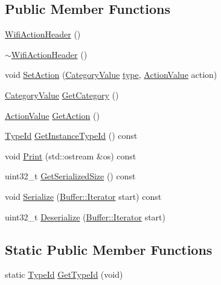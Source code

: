 \subsection*{Public Member Functions}
\begin{DoxyCompactItemize}
\item 
\hyperlink{classns3_1_1WifiActionHeader_a816b15ecdd8e7694c87a858764b214c3}{Wifi\+Action\+Header} ()
\item 
\hyperlink{classns3_1_1WifiActionHeader_a434e2b6cda0d7083112f56834cc57152}{$\sim$\+Wifi\+Action\+Header} ()
\item 
void \hyperlink{classns3_1_1WifiActionHeader_ab904b1e476e1dd0e0426c84c5970a2eb}{Set\+Action} (\hyperlink{classns3_1_1WifiActionHeader_a5402becd11b4077f22d76c4d0d923358}{Category\+Value} \hyperlink{visualizer-ideas_8txt_add98db9e15e2a58cf2b57623e7aa893a}{type}, \hyperlink{unionns3_1_1WifiActionHeader_1_1ActionValue}{Action\+Value} action)
\item 
\hyperlink{classns3_1_1WifiActionHeader_a5402becd11b4077f22d76c4d0d923358}{Category\+Value} \hyperlink{classns3_1_1WifiActionHeader_a6770270aecf8921377529d1c16cc10f2}{Get\+Category} ()
\item 
\hyperlink{unionns3_1_1WifiActionHeader_1_1ActionValue}{Action\+Value} \hyperlink{classns3_1_1WifiActionHeader_a9ec1872abca36121927fb83c837a4966}{Get\+Action} ()
\item 
\hyperlink{classns3_1_1TypeId}{Type\+Id} \hyperlink{classns3_1_1WifiActionHeader_a424c348ebf8fe2c2eeef33a69f287cf7}{Get\+Instance\+Type\+Id} () const 
\item 
void \hyperlink{classns3_1_1WifiActionHeader_a780d168d358dcf5911f1160e58e44d36}{Print} (std\+::ostream \&os) const 
\item 
uint32\+\_\+t \hyperlink{classns3_1_1WifiActionHeader_aaf1e7ac3a054df9a52d60053373403ed}{Get\+Serialized\+Size} () const 
\item 
void \hyperlink{classns3_1_1WifiActionHeader_a79eb26ab6c1a7c002d191e0dac565bb7}{Serialize} (\hyperlink{classns3_1_1Buffer_1_1Iterator}{Buffer\+::\+Iterator} start) const 
\item 
uint32\+\_\+t \hyperlink{classns3_1_1WifiActionHeader_a1f07daed13f4cec7f11a07d50363fad8}{Deserialize} (\hyperlink{classns3_1_1Buffer_1_1Iterator}{Buffer\+::\+Iterator} start)
\end{DoxyCompactItemize}
\subsection*{Static Public Member Functions}
\begin{DoxyCompactItemize}
\item 
static \hyperlink{classns3_1_1TypeId}{Type\+Id} \hyperlink{classns3_1_1WifiActionHeader_af97f283e60c9f6a8d0d9a45cff0bfbe1}{Get\+Type\+Id} (void)
\end{DoxyCompactItemize}
